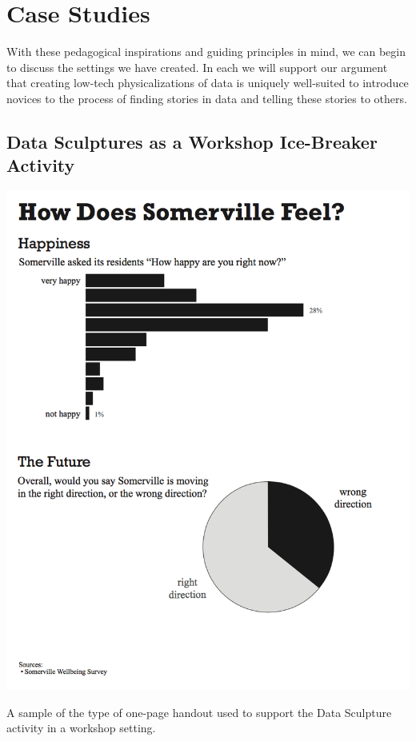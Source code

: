 \documentclass{sigchi-ext}
\begin{document}
\section{Case Studies}

With these pedagogical inspirations and guiding principles in mind, we can begin to discuss the settings we have created.  In each we will support our argument that creating low-tech physicalizations of data is uniquely well-suited to introduce novices to the process of finding stories in data and telling these stories to others.

\subsection{Data Sculptures as a Workshop Ice-Breaker Activity}

\begin{marginfigure}[-25pc]
  \begin{minipage}{\marginparwidth}
    \centering
    \includegraphics[width=1.0\marginparwidth]{figures/data-sculpture-handout}
    \caption{A sample of the type of one-page handout used to support the Data Sculpture activity in a workshop setting.}~\label{fig:handout}
  \end{minipage}
\end{marginfigure}
\end{document}
